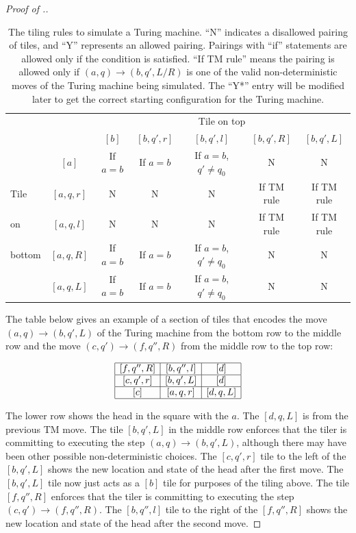 \begin{proof}[Proof of .]
\begin{table}
\begin{centering}
\bigskip
\begin{tabular}{lc|ccccc}
       &             &                \multicolumn{5}{c}{Tile on top} \\
       &             & $[b]$    & $[b,q',r]$ & $[b,q',l]$                & $[b,q',R]$ & $[b,q',L]$ \\
 \hline
       & $[a]$       & If $a=b$ &  If $a=b$  &  If $a=b$, $q' \neq q_0$  &     N      &     N   \\
Tile   & $[a,q,r]$   &    N     &     N      &     N                     & If TM rule & If TM rule \\
on     & $[a,q,l]$   &    N     &     N      &     N                     & If TM rule & If TM rule \\
bottom & $[a,q,R]$   & If $a=b$ &  If $a=b$  &  If $a=b$, $q' \neq q_0$  &     N      &     N   \\
       & $[a,q,L]$   & If $a=b$ &  If $a=b$  &  If $a=b$, $q' \neq q_0$  &     N      &     N   \\
\end{tabular}
\caption{The tiling rules to simulate a Turing machine.  ``N'' indicates a disallowed pairing of tiles, and ``Y'' represents an allowed pairing.  Pairings with ``if'' statements are allowed only if the condition is satisfied.  ``If TM rule'' means the pairing is allowed only if $(a,q) \rightarrow (b,q',L/R)$ is one of the valid non-deterministic moves of the Turing machine being simulated.  The ``Y*'' entry will be modified later to get the correct starting configuration for the Turing machine. }
\label{table:TM}
\end{centering}
\end{table}
%
%
The table below gives an example of a section of tiles that
encodes the move $(a,q) \rightarrow (b,q',L)$ of the Turing machine from the bottom
row to the middle row and the move $(c,q') \rightarrow (f,q'',R)$ from
the middle row to the top row:

\[
\begin{array}{|c|c|c|}
\hline
[f,q'',R] & [b,q'',l] & [d] \\
\hline
[c,q',r] & [b,q',L] & [d] \\
\hline
[c] & [a,q,r] & [d,q,L]\\
\hline
\end{array}
\]

The lower row shows the head in the square with the $a$. The $[d,q,L]$
is from the previous TM move.
The tile $[b,q',L]$ in the middle row
enforces that the tiler is committing to executing the
step $(a,q) \rightarrow (b,q',L)$, although there may have been
other possible non-deterministic choices. The $[c,q',r]$ tile to the left of
the $[b,q',L]$ shows the new location and state of the head after the first move.
The $[b,q',L]$ tile now just acts as a $[b]$ tile for purposes of
the tiling above. The tile $[f,q'',R]$ enforces that the
tiler is committing to executing the step $(c,q') \rightarrow (f,q'',R)$.
The $[b,q'',l]$ tile to the right of
the $[f,q'',R]$ shows the new location and state of the head after the second move.



\end{proof}
